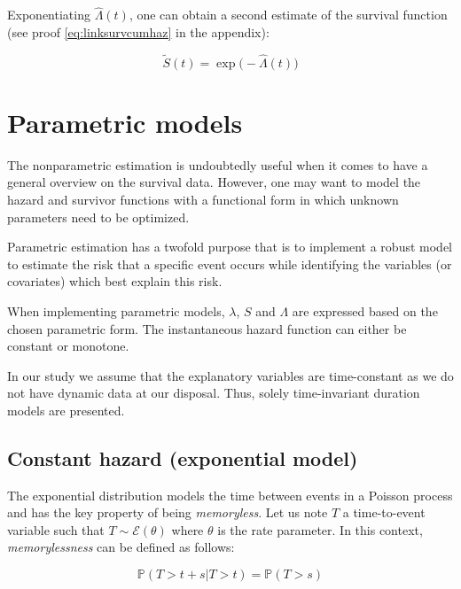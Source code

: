 \documentclass[
]{book}
\begin{document}
Exponentiating \(\hat{\Lambda}(t)\), one can obtain a second estimate of the survival function (see proof \eqref{eq:linksurvcumhaz} in the appendix):

\begin{equation}
    \tilde{S}(t) = \exp \big( -\hat{\Lambda}(t) \big)
    \label{eq:survest}
\end{equation}

\hypertarget{parametric-models}{%
\section{Parametric models}\label{parametric-models}}

The nonparametric estimation is undoubtedly useful when it comes to have a general overview on the survival data. However, one may want to model the hazard and survivor functions with a functional form in which unknown parameters need to be optimized.

Parametric estimation has a twofold purpose that is to implement a robust model to estimate the risk that a specific event occurs while identifying the variables (or covariates) which best explain this risk.

When implementing parametric models, \(\lambda\), \(S\) and \(\Lambda\) are expressed based on the chosen parametric form. The instantaneous hazard function can either be constant or monotone.

In our study we assume that the explanatory variables are time-constant as we do not have dynamic data at our disposal. Thus, solely time-invariant duration models are presented.

\hypertarget{constant-hazard-exponential-model}{%
\subsection{Constant hazard (exponential model)}\label{constant-hazard-exponential-model}}

The exponential distribution models the time between events in a Poisson process and has the key property of being \emph{memoryless}. Let us note \(T\) a time-to-event variable such that \(T \sim \mathcal{E}(\theta)\) where \(\theta\) is the rate parameter. In this context, \emph{memorylessness} can be defined as follows:

\begin{equation}
  \mathbb{P}(T>t+s | T > t) = \mathbb{P}(T>s)
  \label{eq:memorylessness}
\end{equation}
\end{document}
